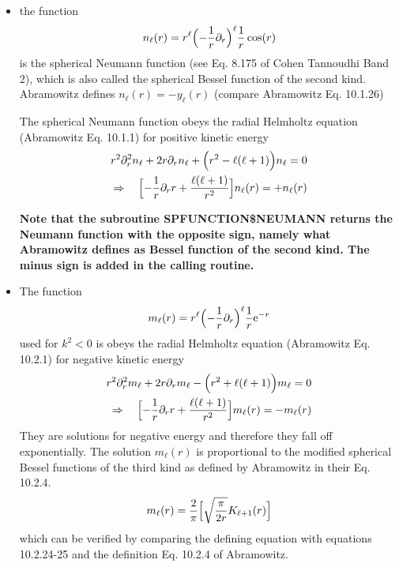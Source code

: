 \documentclass[11pt,a4paper]{report}
\begin{document}
\begin{itemize}
\item the function
\begin{eqnarray}
n_\ell(r)=r^\ell\Bigl(-\frac{1}{r}\partial_r\Bigr)^\ell\frac{1}{r}\cos(r)
\label{eq:defneumann}
\end{eqnarray}
is the spherical Neumann function (see Eq. 8.175 of Cohen Tannoudhi
Band 2), which is also called the spherical Bessel function of the
second kind. Abramowitz defines $n_\ell(r)=-y_\ell(r)$ (compare
Abramowitz Eq. 10.1.26)

The spherical Neumann function obeys the radial Helmholtz equation
(Abramowitz Eq. 10.1.1) for positive kinetic energy
\begin{eqnarray}
r^2\partial^2_r n_\ell+2r\partial_r n_\ell+\Bigl(r^2-\ell(\ell+1)\Bigr) n_\ell=0
\nonumber\\
\Rightarrow\quad
\Bigl[-\frac{1}{r}\partial_r r +\frac{\ell(\ell+1)}{r^2}\Bigr]
n_\ell(r)=+n_\ell(r)
\end{eqnarray}

\textbf{Note that the subroutine SPFUNCTION\$NEUMANN returns the
  Neumann function with the opposite sign, namely what Abramowitz
  defines as Bessel function of the second kind. The minus sign is
  added in the calling routine.}
%
\item The function 
\begin{eqnarray}
m_\ell(r)=r^\ell\Bigl(-\frac{1}{r}\partial_r\Bigr)^\ell\frac{1}{r}\mathrm{e}^{-r}
\label{eq:defml}
\end{eqnarray}
used for $k^2<0$ is obeys the radial Helmholtz equation (Abramowitz
Eq. 10.2.1) for negative kinetic energy
\begin{eqnarray}
r^2\partial^2_r m_\ell
+2r\partial_r m_\ell
-\Bigl(r^2+\ell(\ell+1)\Bigr) m_\ell=0
\nonumber\\
\Rightarrow\quad
\Bigl[-\frac{1}{r}\partial_r r +\frac{\ell(\ell+1)}{r^2}\Bigr]
m_\ell(r)=-m_\ell(r)
\end{eqnarray}
They are solutions for negative energy and therefore they fall off
exponentially.  The solution $m_\ell(r)$ is proportional to the
modified spherical Bessel functions of the third kind as defined by
Abramowitz\cite{abramowitz64_book} in their Eq. 10.2.4.
\begin{eqnarray}
m_\ell(r)=\frac{2}{\pi} \Bigl[\sqrt{\frac{\pi}{2r}} K_{\ell+1}(r)\Bigr]
\end{eqnarray}
which can be verified by comparing the defining equation 
with equations 10.2.24-25 and the definition Eq. 10.2.4 of Abramowitz.
\end{itemize}
\end{document}
